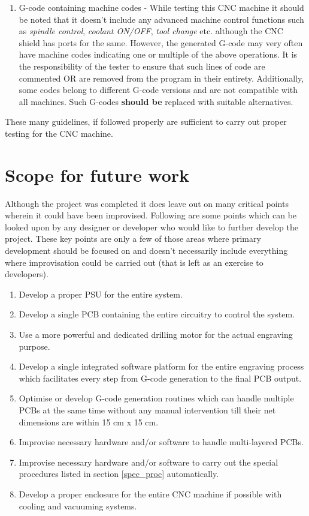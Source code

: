 \begin{enumerate}
   
   \item G-code containing machine codes - While testing this CNC machine it should be noted that it doesn’t include any advanced machine control functions such as \textit{spindle control}, \textit{coolant ON/OFF}, \textit{tool change} etc. although the CNC shield has ports for the same. However, the generated G-code may very often have machine codes indicating one or multiple of the above operations. It is the responsibility of the tester to ensure that such lines of code are commented OR are removed from the program in their entirety. Additionally, some codes belong to different G-code versions and are not compatible with all machines. Such G-codes \textbf{should be} replaced with suitable alternatives.

\end{enumerate}

These many guidelines, if followed properly are sufficient to carry out proper testing for the CNC machine.

\section{Scope for future work}

Although the project was completed it does leave out on many critical points wherein it could have been improvised. Following are some points which can be looked upon by any designer or developer who would like to further develop the project. These key points are only a few of those areas where primary development should be focused on and doesn’t necessarily include everything where improvisation could be carried out (that is left as an exercise to developers).

\begin{enumerate}
    \item Develop a proper PSU for the entire system.
    \item Develop a single PCB containing the entire circuitry to control the system.
    \item Use a more powerful and dedicated drilling motor for the actual engraving purpose.
    \item Develop a single integrated software platform for the entire engraving process which facilitates every step from G-code generation to the final PCB output.
    \item Optimise or develop G-code generation routines which can handle multiple PCBs at the same time without any manual intervention till their net dimensions are within 15 cm x 15 cm.
    \item Improvise necessary hardware and/or software to handle multi-layered PCBs.
    \item Improvise necessary hardware and/or software to carry out the special procedures listed in section \ref{spec_proc} automatically.
    \item Develop a proper enclosure for the entire CNC machine if possible with cooling and vacuuming systems.
\end{enumerate}



